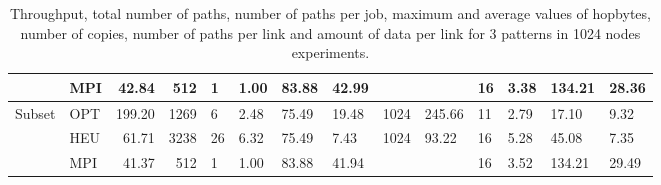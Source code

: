 \begin{table}[!htbp]
\begin{tabular}{| l | l | r | r | p{0.5cm} | p{0.5cm} | p{0.5cm} | p{0.5cm} |p{0.5cm} | p{0.5cm} |p{0.5cm} | p{0.5cm} |p{0.55cm} | p{0.5cm} |}
    & MPI    & 42.84 & 512 & 1 & 1.00 & 83.88 & 42.99 &  & & 16 & 3.38 & 134.21 & 28.36 \\ \hline
    \multirow{3}{*}{Subset} & OPT    & 199.20 & 1269 & 6 & 2.48 & 75.49 & 19.48 & 1024 & 245.66 & 11 & 2.79 & 17.10 & 9.32 \\ \cline{2-14}
    & HEU &  61.71 & 3238 & 26 & 6.32 & 75.49 & 7.43 & 1024 & 93.22 & 16 & 5.28 & 45.08  & 7.35 \\ \cline{2-14}
    & MPI    &  41.37 & 512  & 1 & 1.00 & 83.88 &  41.94 & & & 16 & 3.52 & 134.21 & 29.49 \\ \hline
    \end{tabular}
    \caption{Throughput, total number of paths, number of paths per job, maximum and average values of hopbytes, number of copies, number of paths per link and amount of data per link for 3 patterns in 1024 nodes experiments.}
    \label{table:constantr}
\end{table}


